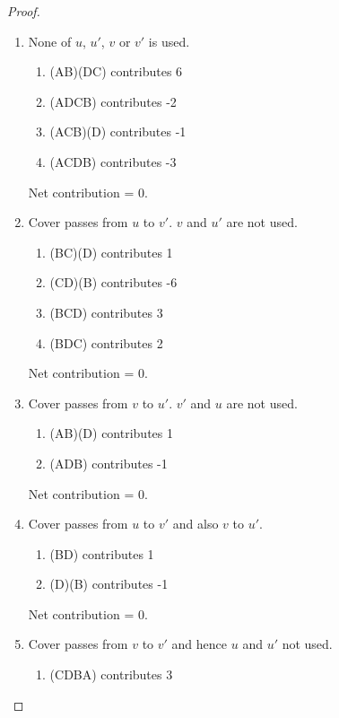 \documentclass[11pt]{article}
\begin{document}
\begin{proof}
        \begin{enumerate}
            \item
                None of $u$, $u'$, $v$ or $v'$ is used. 
                \begin{enumerate}
                    \item (AB)(DC) contributes 6 
                    \item (ADCB) contributes -2
                    \item (ACB)(D)  contributes  -1
                    \item (ACDB)  contributes    -3
                \end{enumerate}
                Net contribution = 0.
            \item
                Cover passes from $u$ to $v'$. $v$ and $u'$ are not used.                 \begin{enumerate}
                    \item (BC)(D) contributes 1 
                    \item (CD)(B) contributes -6
                    \item (BCD)  contributes  3
                    \item (BDC)  contributes  2
                \end{enumerate}
                Net contribution = 0.
            \item
                Cover passes from $v$ to $u'$. $v'$ and $u$ are not used.                 \begin{enumerate}
                    \item (AB)(D) contributes 1 
                    \item (ADB) contributes -1
                \end{enumerate}
                Net contribution = 0.
            \item
                Cover passes from $u$ to $v'$ and also $v$ to $u'$.                 \begin{enumerate}
                    \item (BD) contributes 1 
                    \item (D)(B) contributes -1
                \end{enumerate}
                Net contribution = 0.
            \item
                Cover passes from $v$ to $v'$ and hence $u$ and $u'$ not used.           \begin{enumerate}
                    \item (CDBA) contributes 3 

\end{enumerate}
\end{enumerate}
\end{proof}
\end{document}
